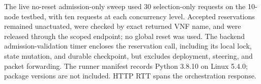 \documentclass[final,5p]{elsarticle}
\newcommand{\rev}[1]{\textcolor{revisiongreen}{#1}}
\let\newrev\rev
\begin{document}
\newrev{The live no-reset admission-only sweep used 30 selection-only requests on the 10-node testbed, with ten requests at each concurrency level. Accepted reservations remained unactuated, were checked by exact returned VNF name, and were released through the scoped endpoint; no global reset was used. The backend admission-validation timer encloses the reservation call, including its local lock, state mutation, and durable checkpoint, but excludes deployment, steering, and packet forwarding. The runner manifest records Python 3.8.10 on Linux 5.4.0; package versions are not included. HTTP RTT spans the orchestration response.}
\begin{table}[p]
\centering
\caption{\newrev{Live admission-only overhead on the 10-node testbed. Ten operations were measured at each concurrency level. Admission and server timings are backend measurements; HTTP RTT spans the orchestration response.}}
\label{tab:p12_live_admission}
\scriptsize
{\color{revisiongreen}
\setlength{\tabcolsep}{3pt}
}
\end{table}

\clearpage


\end{document}
